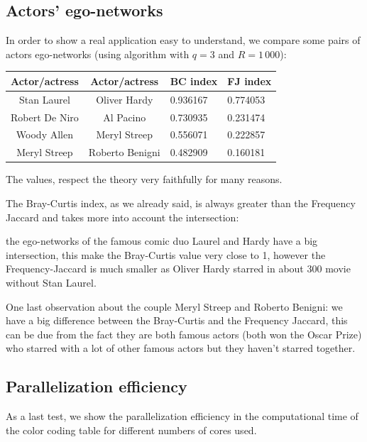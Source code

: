 \subsection*{Actors' ego-networks}

In order to show a real application easy to understand, we compare
some pairs of actors ego-networks (using \fcount algorithm with $q=3$ and $R=1\,000$):\medskip

\begin{table}[h]
	\centering
	\begin{tabular}{c|c|l|l}
		Actor/actress  & Actor/actress   & BC index & FJ index \\ 
		\hline
		Stan Laurel    & Oliver Hardy    & 0.936167 & 0.774053 \\
		Robert De Niro & Al Pacino       & 0.730935 & 0.231474 \\
		Woody Allen    & Meryl Streep    & 0.556071 & 0.222857 \\
		Meryl Streep   & Roberto Benigni & 0.482909 & 0.160181 \\
	\end{tabular}
\end{table}

\medskip

The values, respect the theory very faithfully for many reasons. \medskip

The Bray-Curtis index, as we already said, is always greater than the Frequency Jaccard and takes more into account the intersection:

the ego-networks of the famous comic duo Laurel and Hardy have a big intersection, this make the Bray-Curtis value very close to 1, however the Frequency-Jaccard is much smaller as Oliver Hardy starred in about $300$ movie without Stan Laurel.

One last observation about the couple Meryl Streep and Roberto Benigni: we have a big difference between the Bray-Curtis and the Frequency Jaccard, this can be due from the fact they are both famous actors (both won the Oscar Prize) who starred with a lot of other famous actors but they haven't starred together.

\subsection*{Parallelization efficiency}

As a last test, we show the parallelization efficiency in the computational time of the color coding table for different numbers of cores used.

